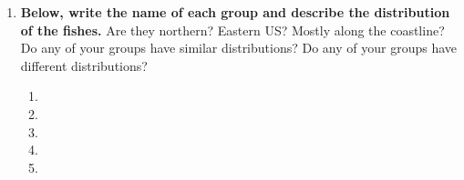 \documentclass[11pt]{article}
\begin{document}
\begin{enumerate}[resume, leftmargin=*]
\item \textbf{Below, write the name of each group and
describe the distribution of the fishes.} Are they northern? Eastern US?
Mostly along the coastline? Do any of your groups have similar
distributions? Do any of your groups have different distributions? \vspace{\baselineskip}
	\begin{enumerate}[label=\alph*., leftmargin=*]
		\item %

		\item \vspace{5\baselineskip}

		\item \vspace{5\baselineskip}

		\item \vspace{5\baselineskip}

		\item \vspace{5\baselineskip}
	\end{enumerate}
\end{enumerate}
\end{document}
